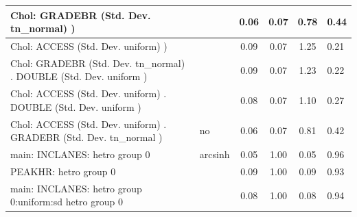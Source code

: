 \begin{table}
\begin{center}
\begin{tabular}{|l|l|c|c|c|l|}
			\hline
			 Chol: GRADEBR (Std. Dev. tn_normal) ) &  & 0.06 & 0.07 & 0.78 & 0.44 \\
			\hline
			 Chol: ACCESS (Std. Dev. uniform) ) &  & 0.09 & 0.07 & 1.25 & 0.21 \\
			\hline
			 Chol: GRADEBR (Std. Dev. tn_normal) . DOUBLE (Std. Dev.   uniform ) &  & 0.09 & 0.07 & 1.23 & 0.22 \\
			\hline
			 Chol: ACCESS (Std. Dev. uniform) . DOUBLE (Std. Dev.   uniform ) &  & 0.08 & 0.07 & 1.10 & 0.27 \\
			\hline
			 Chol: ACCESS (Std. Dev. uniform) . GRADEBR (Std. Dev.   tn_normal ) & no & 0.06 & 0.07 & 0.81 & 0.42 \\
			\hline
			main: INCLANES: hetro group 0 & arcsinh & 0.05 & 1.00 & 0.05 & 0.96 \\
			\hline
			PEAKHR: hetro group 0 &  & 0.09 & 1.00 & 0.09 & 0.93 \\
			\hline
			main: INCLANES: hetro group 0:uniform:sd  hetro group 0 &  & 0.08 & 1.00 & 0.08 & 0.94 \\
			\hline
		\end{tabular}
	\end{center}
\end{table}